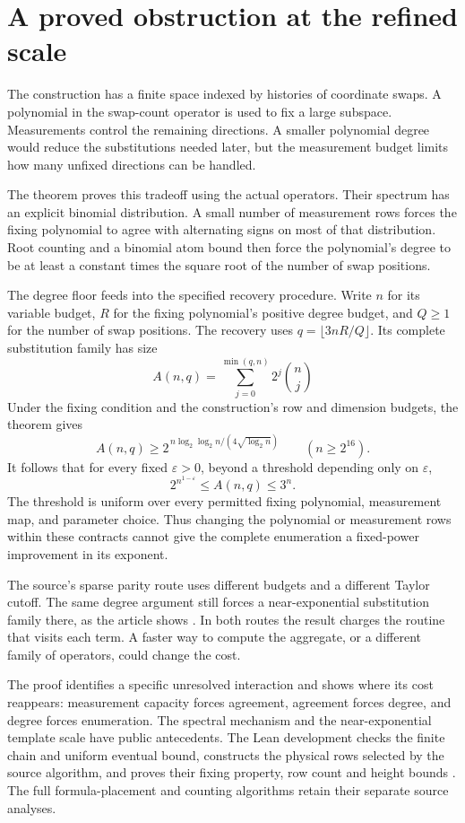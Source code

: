 \documentclass[11pt,letterpaper]{article}
\begin{document}
\section{A proved obstruction at the refined
scale}\label{a-proved-obstruction-at-the-refined-scale}

The construction has a finite space indexed by histories of coordinate
swaps. A polynomial in the swap-count operator is used to fix a large
subspace. Measurements control the remaining directions. A smaller
polynomial degree would reduce the substitutions needed later, but the
measurement budget limits how many unfixed directions can be handled.

The theorem proves this tradeoff using the actual operators. Their
spectrum has an explicit binomial distribution. A small number of
measurement rows forces the fixing polynomial to agree with alternating
signs on most of that distribution. Root counting and a binomial atom
bound then force the polynomial's degree to be at least a constant times
the square root of the number of swap positions.

The degree floor feeds into the specified recovery procedure. Write
\(n\) for its variable budget, \(R\) for the fixing polynomial's
positive degree budget, and \(Q\ge1\) for the number of swap positions.
The recovery uses \(q=\lfloor3nR/Q\rfloor\). Its complete substitution
family has size \[A(n,q)=\sum_{j=0}^{\min(q,n)}2^j\binom nj\] Under the
fixing condition and the construction's row and dimension budgets, the
theorem gives \[A(n,q)\ge
2^{\,n\log_2\log_2 n/(4\sqrt{\log_2 n})}
\qquad(n\ge2^{16}).\] It follows that for every fixed \(\varepsilon>0\),
beyond a threshold depending only on \(\varepsilon\),
\[2^{n^{1-\varepsilon}}\le A(n,q)\le3^n.\] The threshold is uniform over
every permitted fixing polynomial, measurement map, and parameter
choice. Thus changing the polynomial or measurement rows within these
contracts cannot give the complete enumeration a fixed-power improvement
in its exponent.

The source's sparse parity route uses different budgets and a different
Taylor cutoff. The same degree argument still forces a near-exponential
substitution family there, as the article shows \citep[Section
5.5]{Main26}. In both routes the result charges the routine that visits
each term. A faster way to compute the aggregate, or a different family
of operators, could change the cost.

The proof identifies a specific unresolved interaction and shows where
its cost reappears: measurement capacity forces agreement, agreement
forces degree, and degree forces enumeration. The spectral mechanism and
the near-exponential template scale have public antecedents. The Lean
development checks the finite chain and uniform eventual bound,
constructs the physical rows selected by the source algorithm, and
proves their fixing property, row count and height bounds
\citep{Main26}. The full formula-placement and counting algorithms
retain their separate source analyses.
\end{document}
